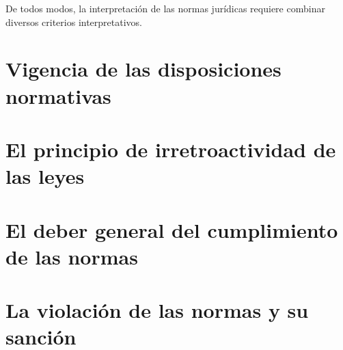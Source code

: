 \documentclass[a4paper,12pt]{report}
\begin{document}
De todos modos, la interpretación de las normas jurídicas requiere combinar diversos criterios interpretativos.

\section{Vigencia de las disposiciones normativas}
\section{El principio de irretroactividad de las leyes}
\section{El deber general del cumplimiento de las normas}
\section{La violación de las normas y su sanción}
\end{document}
